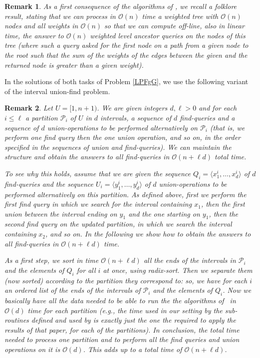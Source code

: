 \documentclass[final]{dmtcs-episciences}
\newcommand{\bigo}{{\mathcal O}}
\newtheorem{remark}{Remark}
\begin{document}
\begin{remark}\label{weighted_tree}As a first consequence of the algorithms of \cite{Gabow83}, we recall a folklore result, stating that we can process in $\bigo(n)$ time a weighted tree with $\bigo(n)$ nodes and all weights in $\bigo(n)$ so that we can compute off-line, also in linear time, the answer to $\bigo(n)$ weighted level ancestor queries on the nodes of this tree (where such a query asked for the first node on a path from a given node to the root such that the sum of the weights of the edges between the given and the returned node is greater than a given weight). 
\end{remark}

In the solutions of both tasks of Problem \ref{LPFgG}, we use the following variant of the interval union-find problem.
\begin{remark}\label{rem_Union_Find} 
Let $U=[1,n+1)$. We are given integers $d,\ell>0$ and for each~$i\leq \ell$ a partition ${\mathcal P}_i$ of $U$ in $d$ intervals, a sequence of $d$ find-queries and a sequence of $d$ union-operations to be performed alternatively on ${\mathcal P}_i$ (that is, we perform one find query then the one union operation, and so on, in the order specified in the sequences of union and find-queries). We can maintain the structure and obtain the answers to all find-queries in $\bigo(n+\ell d)$ total time. 

To see why this holds, assume that we are given the sequence $Q_i=\langle x^i_1,\ldots,x^i_d\rangle$ of $d$ find-queries and the sequence $U_i=\langle y^i_1,\ldots,y^i_d\rangle$ of $d$ union-operations to be performed alternatively on this partition. As defined above, first we perform the first find query in which we search for the interval containing $x_1$, then the first union between the interval ending on $y_1$ and the one starting on $y_1$, then the second find query on the updated partition, in which we search the interval containing $x_2$, and so on. In the following we show how to obtain the answers to all find-queries in $\bigo(n+\ell d)$ time. 

As a first step, we sort in time $\bigo(n+\ell d)$ all the ends of the intervals in ${\mathcal P}_i$ and the elements of $Q_i$ for all $i$ at once, using radix-sort. Then we separate them (now sorted) according to the partition they correspond to: so, we have for each $i$ an ordered list of the ends of the intervals of ${\mathcal P}_i$ and the elements of $Q_i$. Now we basically have all the data needed to be able to run the the algorithms of~\cite{Gabow83} in $\bigo(d)$ time for each partition (e.g., the time used in our setting by the sub-routines defined and used by \cite{Gabow83} is exactly just the one the required to apply the results of that paper, for each of the partitions). In conclusion, the total time needed to process one partition and to perform all the find queries and union operations on it is $\bigo(d)$. This adds up to a total time of $\bigo(n+\ell d)$. 
\end{remark}
\end{document}

